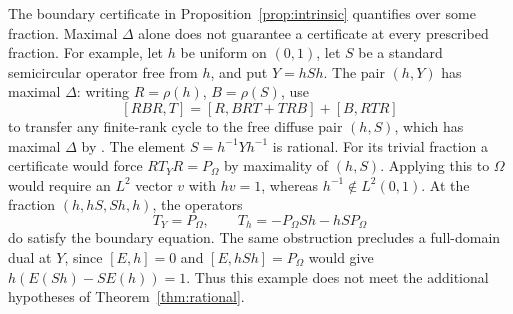 \begin{remark}\label{rem:some-every}
The boundary certificate in Proposition~\ref{prop:intrinsic} quantifies over some fraction.
Maximal $\Delta$ alone does not guarantee a certificate at every prescribed fraction.
For example, let $h$ be uniform on $(0,1)$, let $S$ be a standard semicircular operator free from $h$, and put $Y=hSh$.
The pair $(h,Y)$ has maximal $\Delta$: writing $R=\rho(h)$, $B=\rho(S)$, use
\[
 [RBR,T]=[R,BRT+TRB]+[B,RTR]
\]
to transfer any finite-rank cycle to the free diffuse pair $(h,S)$, which has maximal $\Delta$ by \cite[Section~6]{MSY23}.
The element $S=h^{-1}Yh^{-1}$ is rational.
For its trivial fraction a certificate would force $RT_YR=P_\Omega$ by maximality of $(h,S)$.
Applying this to $\Omega$ would require an $L^2$ vector $v$ with $hv=1$, whereas $h^{-1}\notin L^2(0,1)$.
At the fraction $(h,hS,Sh,h)$, the operators
\[
 T_Y=P_\Omega,\qquad T_h=-P_\Omega Sh-hSP_\Omega
\]
do satisfy the boundary equation.
The same obstruction precludes a full-domain dual at $Y$, since $[E,h]=0$ and $[E,hSh]=P_\Omega$ would give $h(E(Sh)-SE(h))=1$.
Thus this example does not meet the additional hypotheses of Theorem~\ref{thm:rational}.
\end{remark}
